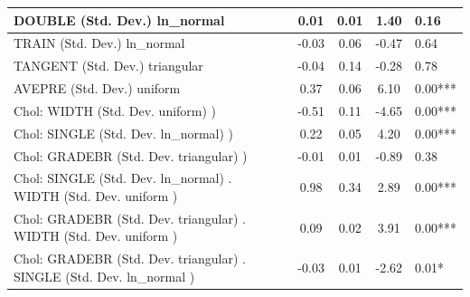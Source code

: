 \begin{table}
\begin{center}
\begin{tabular}{|l|l|c|c|c|l|}
			\hline
			DOUBLE (Std. Dev.) ln_normal &  & 0.01 & 0.01 & 1.40 & 0.16 \\
			\hline
			TRAIN (Std. Dev.) ln_normal &  & -0.03 & 0.06 & -0.47 & 0.64 \\
			\hline
			TANGENT (Std. Dev.) triangular &  & -0.04 & 0.14 & -0.28 & 0.78 \\
			\hline
			AVEPRE (Std. Dev.) uniform &  & 0.37 & 0.06 & 6.10 & 0.00*** \\
			\hline
			 Chol: WIDTH (Std. Dev. uniform) ) &  & -0.51 & 0.11 & -4.65 & 0.00*** \\
			\hline
			 Chol: SINGLE (Std. Dev. ln_normal) ) &  & 0.22 & 0.05 & 4.20 & 0.00*** \\
			\hline
			 Chol: GRADEBR (Std. Dev. triangular) ) &  & -0.01 & 0.01 & -0.89 & 0.38 \\
			\hline
			 Chol: SINGLE (Std. Dev. ln_normal) . WIDTH (Std. Dev.   uniform ) &  & 0.98 & 0.34 & 2.89 & 0.00*** \\
			\hline
			 Chol: GRADEBR (Std. Dev. triangular) . WIDTH (Std. Dev.   uniform ) &  & 0.09 & 0.02 & 3.91 & 0.00*** \\
			\hline
			 Chol: GRADEBR (Std. Dev. triangular) . SINGLE (Std. Dev.   ln_normal ) &  & -0.03 & 0.01 & -2.62 & 0.01* \\
			\hline
		\end{tabular}
	\end{center}
\end{table}